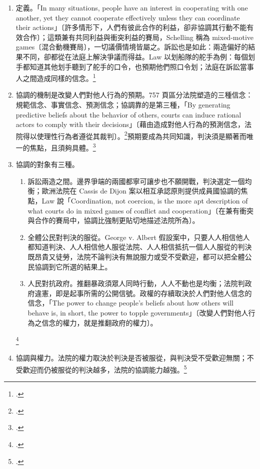 \begin{enumerate}
\tightlist
\item
  定義。「In many situations, people have an interest in cooperating with one another, yet they cannot cooperate effectively unless they can coordinate their actions」〔許多情形下，人們有彼此合作的利益，卻非協調其行動不能有效合作〕；這類兼有共同利益與衝突利益的賽局，Schelling 稱為 mixed-motive games〔混合動機賽局〕，一切議價情境皆屬之。訴訟也是如此：兩造偏好的結果不同，卻都從在法庭上解決爭議而得益。Law 以划船隊的舵手為例：每個划手都知道其他划手聽到了舵手的口令，也預期他們照口令划；法庭在訴訟當事人之間造成同樣的信念。\footcite[758]{law2009}
\item
  協調的機制是改變人們對他人行為的預期。757 頁區分法院塑造的三種信念：規範信念、事實信念、預測信念；協調靠的是第三種，「By generating predictive beliefs about the behavior of others, courts can induce rational actors to comply with their decisions」〔藉由造成對他人行為的預測信念，法院得以使理性行為者遵從其裁判〕。\footcite[757]{law2009}預期要成為共同知識，判決須是顯著而唯一的焦點，且須夠具體。\footcite[770--778]{law2009}
\item
  協調的對象有三種。
  \begin{enumerate}
  \tightlist
  \item 訴訟兩造之間。邊界爭端的兩國都寧可讓步也不願開戰，判決選定一個均衡；歐洲法院在 Cassis de Dijon 案以相互承認原則提供成員國協調的焦點，Law 說「Coordination, not coercion, is the more apt description of what courts do in mixed games of conflict and cooperation」〔在兼有衝突與合作的賽局中，協調比強制更貼切地描述法院所為〕。
  \item 全體公民對判決的服從。George v. Albert 假設案中，只要人人相信他人都知道判決、人人相信他人服從法院、人人相信抵抗一個人人服從的判決既昂貴又徒勞，法院不論判決有無說服力或受不受歡迎，都可以把全體公民協調到它所選的結果上。
  \item 人民對抗政府。推翻暴政須眾人同時行動，人人不動也是均衡；法院判政府違憲，即是起事所需的公開信號。政權的存續取決於人們對他人信念的信念，「The power to change people's beliefs about how others will behave is, in short, the power to topple governments」〔改變人們對他人行為之信念的權力，就是推翻政府的權力〕。
  \end{enumerate}
  \footcite[759--770]{law2009}
\item
  協調與權力。法院的權力取決於判決是否被服從，與判決受不受歡迎無關；不受歡迎而仍被服從的判決越多，法院的協調能力越強。\footcite[780--782]{law2009}
\end{enumerate}

